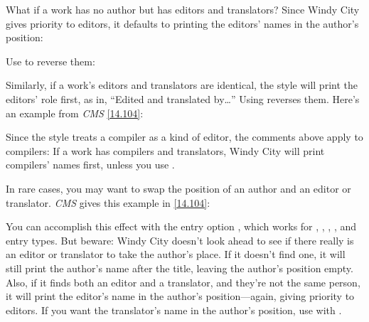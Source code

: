 \documentclass[11pt,letterpaper,oneside]{article}
\begin{document}
What if a work has no author but has editors and translators? Since
Windy City gives priority to editors, it defaults to printing the
editors' names in the author's position:

\begin{citebib}
\item \cite{smith2002a}
\end{citebib}

\noindent Use  to reverse them:

\begin{citebib}
\item \cite{smith2002b}
\end{citebib}

Similarly, if a work's editors and translators are identical, the
style will print the editors' role first, as in, ``Edited and
translated by\ldots'' Using  reverses them. Here's an
example from \textit{CMS} \ref{14.104}:

\begin{citebib}
\item \cite{menchu1999}
\end{citebib}

Since the style treats a compiler as a kind of editor, the comments
above apply to compilers: If a work has compilers and translators,
Windy City will print compilers' names first, unless you use
.

In rare cases, you may want to swap the position of an author and an
editor or translator. \textit{CMS} gives this example in \ref{14.104}:

\begin{citebib}
\item \cite{pound1953}
\end{citebib}

\noindent You can accomplish this effect with the entry option
, which works for , ,
, , and 
entry types. But beware: Windy City doesn't look ahead to see if there
really is an editor or translator to take the author's place. If it
doesn't find one, it will still print the author's name after the
title, leaving the author's position empty. Also, if it finds both an
editor and a translator, and they're not the same person, it will
print the editor's name in the author's position---again, giving
priority to editors. If you want the translator's name in the author's
position, use  with .
\end{document}
